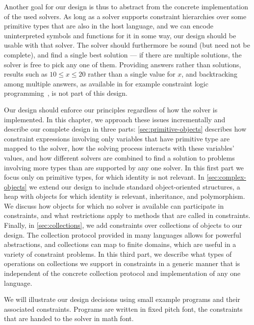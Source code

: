 Another goal for our design is thus to abstract from the concrete
implementation of the used solvers. As long as a solver supports
constraint hierarchies over some primitive types that are also in the
host language, and we can encode uninterpreted symbols and functions
for it in some way, our design should be usable with that solver.  The
solver should furthermore be sound (but need not be complete), and
find a single best solution --- if there are multiple solutions, the
solver is free to pick any one of them.  Providing answers rather than
solutions, \ie results such as $10 \leq x \leq 20$ rather than a
single value for $x$, and backtracking among multiple answers, as
available in for example constraint logic programming~\cite{jaffar-popl-1987}, is not part of this design.

Our design should enforce our principles regardless of how the solver is
implemented.  In this chapter, we approach these issues incrementally and
describe our complete design in three parts: \autoref{sec:primitive-objects}
describes how constraint expressions involving only variables that have
primitive type are mapped to the solver, how the solving process interacts with
these variables' values, and how different solvers are combined to find a
solution to problems involving more types than are supported by any one
solver. In this first part we focus only on primitive types, for which identity
is not relevant. In \autoref{sec:complex-objects} we extend our design to
include standard object-oriented structures, a heap with objects for which
identity is relevant, inheritance, and polymorphism. We discuss how objects for
which no solver is available can participate in constraints, and what
restrictions apply to methods that are called in constraints. Finally, in
\autoref{sec:collections}, we add constraints over collections of objects to our
design. The collection protocol provided in many languages allows for powerful
abstractions, and collections can map to finite domains, which are useful in a
variety of constraint problems. In this third part, we describe what types of
operations on collections we support in constraints in a generic manner that is
independent of the concrete collection protocol and implementation of any one
language.

We will illustrate our design decisions using small example programs
and their associated constraints. Programs are written in fixed pitch
font, the constraints that are handed to the solver in math font.


